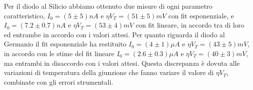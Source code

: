 \documentclass[]{article}
\begin{document}
Per il diodo al Silicio abbiamo ottenuto due misure di ogni parametro caratteristico, $I_0=(5\pm5)nA$ e $\eta V_T=(51\pm5)mV$ con fit esponenziale, e $I_0=(7.2\pm0.7)nA$ e $\eta V_T=(53\pm4)mV$ con fit lineare, in accordo tra di loro ed entrambe in accordo con i valori attesi. Per quanto riguarda il diodo al Germanio il fit esponenziale ha restituito $I_0=(4\pm1)\mu A$ e $\eta V_T=(43\pm5)mV$, in accordo con le stime del fit lineare $I_0=(2.6\pm0.3)\mu A$ e $\eta V_T=(40\pm3)mV$, ma entrambi in disaccordo con i valori attesi. Questa discrepanza è dovuta alle variazioni di temperatura della giunzione che fanno variare il valore di $\eta V_T$, combinate con gli errori strumentali.
\end{document}
